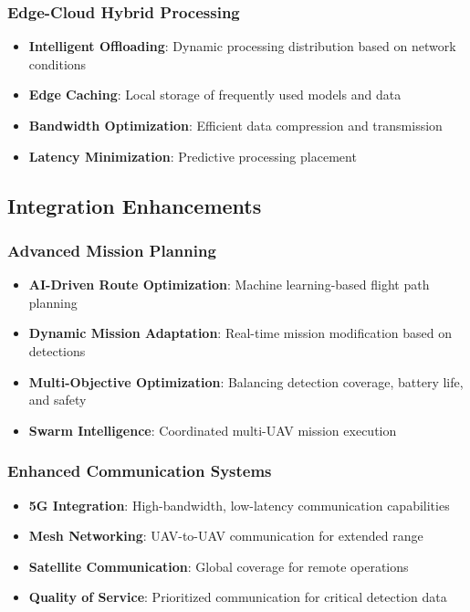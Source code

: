\documentclass[11pt,a4paper]{article}
\begin{document}
\subsubsection{Edge-Cloud Hybrid Processing}

\begin{itemize}
    \item \textbf{Intelligent Offloading}: Dynamic processing distribution based on network conditions
    \item \textbf{Edge Caching}: Local storage of frequently used models and data
    \item \textbf{Bandwidth Optimization}: Efficient data compression and transmission
    \item \textbf{Latency Minimization}: Predictive processing placement
\end{itemize}

\subsection{Integration Enhancements}

\subsubsection{Advanced Mission Planning}

\begin{itemize}
    \item \textbf{AI-Driven Route Optimization}: Machine learning-based flight path planning
    \item \textbf{Dynamic Mission Adaptation}: Real-time mission modification based on detections
    \item \textbf{Multi-Objective Optimization}: Balancing detection coverage, battery life, and safety
    \item \textbf{Swarm Intelligence}: Coordinated multi-UAV mission execution
\end{itemize}

\subsubsection{Enhanced Communication Systems}

\begin{itemize}
    \item \textbf{5G Integration}: High-bandwidth, low-latency communication capabilities
    \item \textbf{Mesh Networking}: UAV-to-UAV communication for extended range
    \item \textbf{Satellite Communication}: Global coverage for remote operations
    \item \textbf{Quality of Service}: Prioritized communication for critical detection data
\end{itemize}
\end{document}
